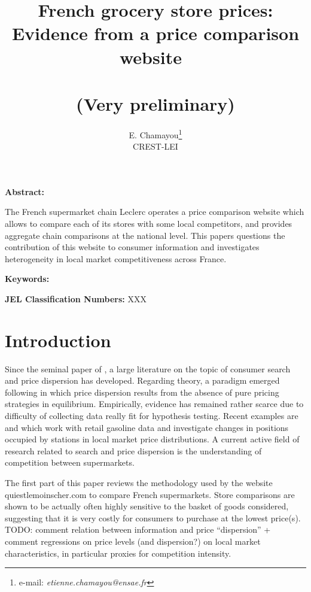 \documentclass[11pt]{article}
\begin{document}
\title{French grocery store prices: Evidence from a price comparison website\ \\ \ \\(Very preliminary)}
\author{E. Chamayou\thanks{e-mail:
\textit{etienne.chamayou@ensae.fr}} \\ CREST-LEI}
\maketitle

\sloppy%

\onehalfspacing

\textbf{Abstract:}

The French supermarket chain Leclerc operates a price comparison website which allows to compare each of its stores with some local competitors, and provides aggregate chain comparisons at the national level. This papers questions the contribution of this website to consumer information and investigates heterogeneity in local market competitiveness across France.

\strut

\textbf{Keywords:}

\strut

\textbf{JEL Classification Numbers:} XXX

\pagebreak%
\doublespacing

\section{Introduction}

Since the seminal paper of \cite{STI61}, a large literature on the topic of consumer search and price dispersion has developed. Regarding theory, a paradigm emerged following \cite{VAR80} in which price dispersion results from the absence of pure pricing strategies in equilibrium. Empirically, evidence has remained rather scarce due to difficulty of collecting data really fit for hypothesis testing. Recent examples are \cite{TAP11} and \cite{CHA15} which work with retail gasoline data and investigate changes in positions occupied by stations in local market price distributions. A current active field of research related to search and price dispersion is the understanding of competition between supermarkets. 

The first part of this paper reviews the methodology used by the website quiestlemoinscher.com to compare French supermarkets. Store comparisons are shown to be actually often highly sensitive to the basket of goods considered, suggesting that it is very costly for consumers to purchase at the lowest price(s). TODO: comment relation between information and price "`dispersion"' + comment regressions on price levels (and dispersion?) on local market characteristics, in particular proxies for competition intensity.
\end{document}
